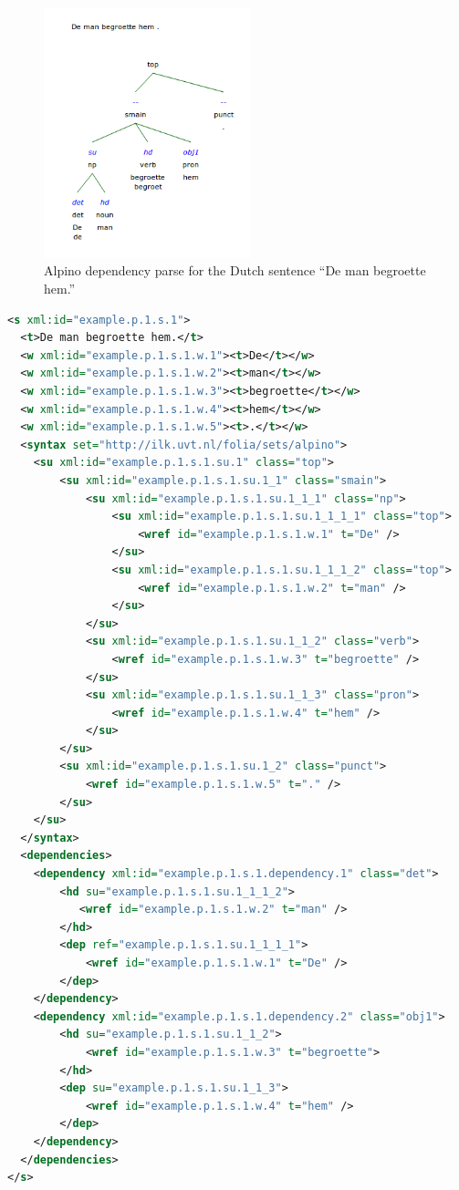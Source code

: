 \documentclass[a4paper,12pt]{report}
\begin{document}
\begin{figure}[h]
\begin{center}
\includegraphics[width=60.0mm]{alpino.png}
\end{center}
\caption{Alpino dependency parse for the Dutch sentence ``De man begroette hem.''}
\label{fig:arch} 
\end{figure}
\FloatBarrier

\begin{lstlisting}[language=xml]
<s xml:id="example.p.1.s.1">
  <t>De man begroette hem.</t>
  <w xml:id="example.p.1.s.1.w.1"><t>De</t></w>
  <w xml:id="example.p.1.s.1.w.2"><t>man</t></w>
  <w xml:id="example.p.1.s.1.w.3"><t>begroette</t></w>
  <w xml:id="example.p.1.s.1.w.4"><t>hem</t></w>
  <w xml:id="example.p.1.s.1.w.5"><t>.</t></w>
  <syntax set="http://ilk.uvt.nl/folia/sets/alpino">
    <su xml:id="example.p.1.s.1.su.1" class="top">     
        <su xml:id="example.p.1.s.1.su.1_1" class="smain">     
            <su xml:id="example.p.1.s.1.su.1_1_1" class="np">     
                <su xml:id="example.p.1.s.1.su.1_1_1_1" class="top">     
                    <wref id="example.p.1.s.1.w.1" t="De" />       
                </su>
                <su xml:id="example.p.1.s.1.su.1_1_1_2" class="top">     
                    <wref id="example.p.1.s.1.w.2" t="man" />
                </su> 
            </su>
            <su xml:id="example.p.1.s.1.su.1_1_2" class="verb">     
                <wref id="example.p.1.s.1.w.3" t="begroette" />   
            </su>
            <su xml:id="example.p.1.s.1.su.1_1_3" class="pron">     
                <wref id="example.p.1.s.1.w.4" t="hem" />   
            </su>
        </su>
        <su xml:id="example.p.1.s.1.su.1_2" class="punct">
            <wref id="example.p.1.s.1.w.5" t="." />               
        </su> 
    </su>
  </syntax>
  <dependencies>
    <dependency xml:id="example.p.1.s.1.dependency.1" class="det">
        <hd su="example.p.1.s.1.su.1_1_1_2">
           <wref id="example.p.1.s.1.w.2" t="man" />   
        </hd>
        <dep ref="example.p.1.s.1.su.1_1_1_1">
            <wref id="example.p.1.s.1.w.1" t="De" />   
        </dep>
    </dependency>
    <dependency xml:id="example.p.1.s.1.dependency.2" class="obj1">
        <hd su="example.p.1.s.1.su.1_1_2">
            <wref id="example.p.1.s.1.w.3" t="begroette">
        </hd>
        <dep su="example.p.1.s.1.su.1_1_3">
            <wref id="example.p.1.s.1.w.4" t="hem" />   
        </dep>
    </dependency>
  </dependencies>
</s>
\end{lstlisting}
\end{document}
